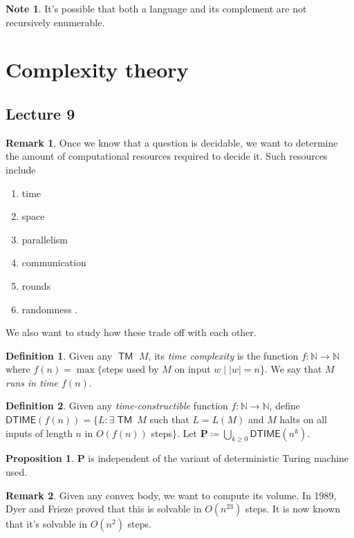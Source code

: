\documentclass[10pt,letterpaper,cm]{nupset}
\theoremstyle{definition}
\newtheorem*{definition}{Definition}
\newtheorem{note}{Note}
\newtheorem{remark}{Remark}
\newtheorem{prop}{Proposition}
\newcommand{\N}{\mathbb N}
\newcommand{\1}{\mathbf{1}}
\newcommand{\0}{\vec 0}
\DeclareMathOperator{\TM}{\mathsf{TM}}
\begin{document}
\begin{note}
It's possible that both a language and its complement are not recursively enumerable. 
\end{note}

\newpage

\section{Complexity theory}

\subsection{Lecture 9}

\begin{remark}
Once we know that a question is decidable, we want to determine the amount of computational resources required to decide it. Such resources include 
\begin{enumerate}[label=(\alph*)]
\item time
\item space
\item parallelism 
\item communication 
\item rounds
\item randomness
.\end{enumerate}
We also want to study how these trade off with each other. 
\end{remark}

\begin{definition}
Given any $\TM$ $M$, its \textit{time complexity} is the function $f: \N \to \N$ where $f(n) =\max\{$steps used by $M$ on input $w\mid |w| =n\}$. We say that $M$ \textit{runs in time $f(n)$}.
\end{definition}

\begin{definition}
 Given any \textit{time-constructible} function $f: \N \to \N$, define $\mathsf{DTIME}(f(n)) = \{ L : \exists \TM \ M$ such that $L = L(M)$ and $M$ halts on all inputs of length $n$ in $O(f(n))$ steps$\}$.
Let $\mathbf{P} \coloneqq \bigcup_{k\geq 0} \mathsf{DTIME}(n^k)$.
\end{definition}

\begin{prop}
$\mathbf{P}$ is independent of the variant of deterministic Turing machine used. 
\end{prop}

\begin{remark}
Given any convex body, we want to compute its volume. In 1989, Dyer and Frieze proved that this is solvable in $O(n^{23})$ steps. It is now known that it's solvable in $O(n^2)$ steps. 
\end{remark}
\end{document}
